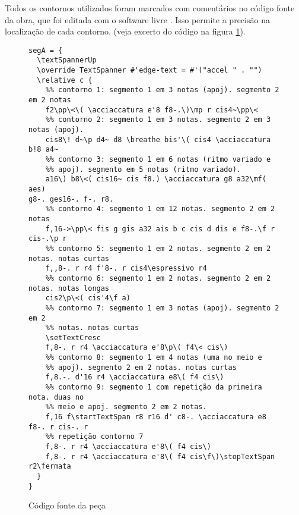 \documentclass[12pt]{article}
\begin{document}
Todos os contornos utilizados foram marcados com comentários no código
fonte da obra, que foi editada com o software livre 
\cite{Nienhuys2007}. Isso permite a precisão na localização de cada
contorno. (veja excerto do código na figura \ref{fig:codigo}).

\begin{figure}[h]
  \centering
\begin{verbatim}
segA = {
  \textSpannerUp
  \override TextSpanner #'edge-text = #'("accel " . "")
  \relative c {
    %% contorno 1: segmento 1 em 3 notas (apoj). segmento 2 em 2 notas
    f2\pp\<\( \acciaccatura e'8 f8-.\)\mp r cis4~\pp\<
    %% contorno 2: segmento 1 em 3 notas. segmento 2 em 3 notas (apoj).
    cis8\! d~\p d4~ d8 \breathe bis'\( cis4 \acciaccatura b!8 a4~
    %% contorno 3: segmento 1 em 6 notas (ritmo variado e
    %% apoj). segmento em 5 notas (ritmo variado).
    a16\) b8\<( cis16~ cis f8.) \acciaccatura g8 a32\mf( aes)
g8-. ges16-. f-. r8.
    %% contorno 4: segmento 1 em 12 notas. segmento 2 em 2 notas
    f,16->\pp\< fis g gis a32 ais b c cis d dis e f8-.\f r cis-.\p r
    %% contorno 5: segmento 1 em 2 notas. segmento 2 em 2 notas. notas curtas
    f,,8-. r r4 f'8-. r cis4\espressivo r4
    %% contorno 6: segmento 1 em 2 notas. segmento 2 em 2 notas. notas longas
    cis2\p\<( cis'4\f a)
    %% contorno 7: segmento 1 em 3 notas (apoj). segmento 2 em 2
    %% notas. notas curtas
    \setTextCresc
    f,8-. r r4 \acciaccatura e'8\p\( f4\< cis\)
    %% contorno 8: segmento 1 em 4 notas (uma no meio e
    %% apoj). segmento 2 em 2 notas. notas curtas
    f,8.-. d'16 r4 \acciaccatura e8\( f4 cis\)
    %% contorno 9: segmento 1 com repetição da primeira nota. duas no
    %% meio e apoj. segmento 2 em 2 notas.
    f,16 f\startTextSpan r8 r16 d' c8-. \acciaccatura e8 f8-. r cis-. r
    %% repetição contorno 7
    f,8-. r r4 \acciaccatura e'8\( f4 cis\)
    f,8-. r r4 \acciaccatura e'8\( f4 cis\f\)\stopTextSpan r2\fermata
  }
}
\end{verbatim}
  \caption{Código fonte da peça}
  \label{fig:codigo}
\end{figure}



\end{document}

